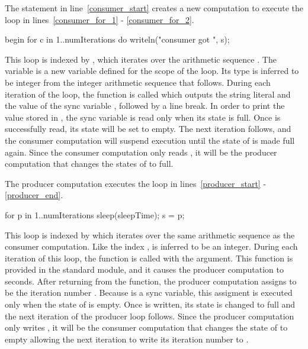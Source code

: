 The  statement in line~\ref{consumer_start} creates a 
new computation to execute the 
loop in lines~\ref{consumer_for_1} - \ref{consumer_for_2}.  
\begin{chapel}
begin {                                
  for c in 1..numIterations do        
    writeln("consumer got ", s);     
}                                   
\end{chapel}
This loop is indexed by , which iterates over
the arithmetic sequence .  The variable  is a new
variable defined for the scope of the loop.  Its type is inferred to be integer from
the integer arithmetic sequence that follows.  During each iteration of the 
loop, the  function is called which outputs the string
literal  and the value of the sync variable , 
followed by a line break.  In order to print the value stored in , the
sync variable is read only when its state is full.  Once  is successfully
read, its state will be set to empty.  The next iteration follows, and the 
consumer computation will suspend execution until the state of  is 
made full again.  Since the consumer computation only reads , it will be 
the producer computation that changes the states of  to full.

The producer computation executes the  loop in lines~\ref{producer_start} -
\ref{producer_end}.  
\begin{chapel}
for p in 1..numIterations {            
  sleep(sleepTime);   
  s = p;
}      
\end{chapel}
This
loop is indexed by  which iterates over the same arithmetic sequence
as the consumer computation.  Like the index ,  is inferred to 
be an integer.
During each iteration of this  loop, the  function is
called with the argument.  This  function is provided
in the  standard module, and it causes the producer computation to
 seconds.  After returning from the  function, 
the producer computation assigns  to be the iteration number .  
Because  is a sync variable, this assigment is executed only when the state of 
 is empty.  Once  is written, its state is changed to full and the
next iteration of the producer loop follows.  Since the producer computation only
writes , it will be the consumer computation that changes the state of
 to empty allowing the next iteration to write its iteration number
to .

